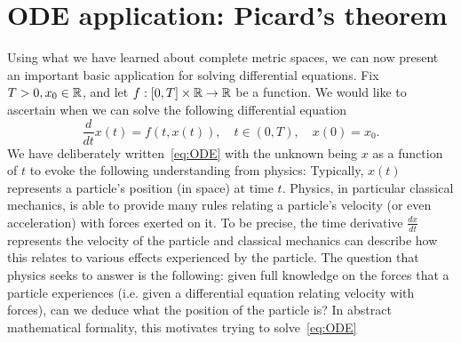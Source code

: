 \section{ODE application: Picard's theorem}
\label{sec:Picard}
Using what we have learned about complete metric spaces, we can now present an important basic application for solving differential equations. Fix $T>0, x_0\in\mathbb{R}$, and let $f:[0,T]\times\mathbb{R}\to\mathbb{R}$ be a function. We would like to ascertain when we can solve the following differential equation
\begin{equation}
	\label{eq:ODE}
	\frac{d}{dt}x(t) = f(t,x(t)),\quad t\in (0,T),\quad x(0) = x_0.
\end{equation}
We have deliberately written~\eqref{eq:ODE} with the unknown being $x$ as a function of $t$ to evoke the following understanding from physics: Typically, $x(t)$ represents a particle's position (in space) at time $t$. Physics, in particular classical mechanics, is able to provide many rules relating a particle's velocity (or even acceleration) with forces exerted on it. To be precise, the time derivative $\frac{dx}{dt}$ represents the velocity of the particle and classical mechanics can describe how this relates to various effects experienced by the particle. The question that physics seeks to answer is the following: given full knowledge on the forces that a particle experiences (i.e. given a differential equation relating velocity with forces), can we deduce what the position of the particle is? In abstract mathematical formality, this motivates trying to solve~\eqref{eq:ODE}

